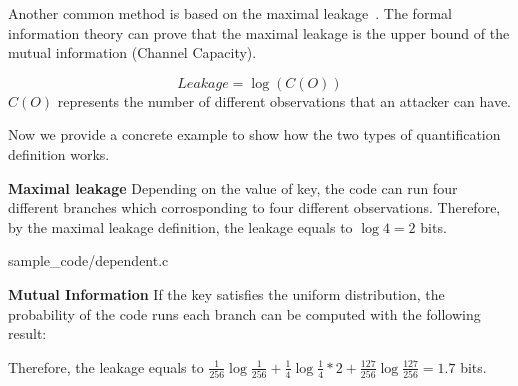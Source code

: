 Another common method is based on the maximal leakage~\cite{10.1007/978-3-642-00596-1_21,10.1007/978-3-642-31424-7_40,182946}.
The formal information theory can prove that the maximal leakage is the upper bound of the mutual 
information (Channel Capacity).

\begin{displaymath}
    \mathit{Leakage} = \log(C(O))
\end{displaymath}
$C(O)$ represents the number of different observations that an attacker can have. 

Now we provide a concrete example to show how the two types of quantification definition works.


\textbf{Maximal leakage} 
Depending on the value of key, the code can run four different branches which corrosponding to 
four different observations. Therefore, by the maximal leakage definition, the leakage equals to 
$\log4 = 2$ bits.


                 {sample_code/dependent.c}

\textbf{Mutual Information} If the key satisfies the uniform distribution, the probability of the code runs each branch
can be computed with the following result: 
\begin{table}[h]
\centering
{}
\caption{The distribution of observations}
\end{table}
Therefore, the leakage equals to 
$\frac{1}{256}\log\frac{1}{256} + \frac{1}{4}\log\frac{1}{4}*2 + \frac{127}{256}\log\frac{127}{256} = 1.7$ bits.

